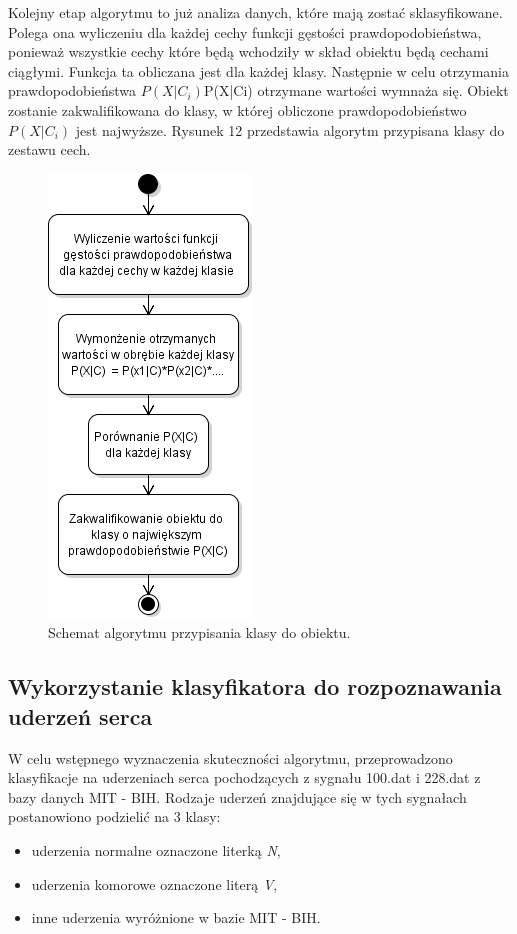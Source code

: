 \documentclass[[10pt,a4paper]{article}
\begin{document}
Kolejny etap algorytmu to już analiza danych, które mają zostać sklasyfikowane. Polega ona wyliczeniu dla każdej cechy funkcji gęstości prawdopodobieństwa, ponieważ wszystkie cechy które będą wchodziły w skład obiektu będą cechami ciągłymi. Funkcja ta obliczana jest dla każdej klasy. Następnie w celu otrzymania prawdopodobieństwa $P(X|C_{i})$P(X|Ci) otrzymane wartości wymnaża się. Obiekt zostanie zakwalifikowana do klasy, w której obliczone prawdopodobieństwo $P(X|C_{i})$ jest najwyższe.  Rysunek 12 przedstawia algorytm przypisana klasy do zestawu cech.
\begin{figure}[h]
\centering
\includegraphics[scale = 0.6]{testowanie_schemat}
\caption{Schemat algorytmu przypisania klasy do obiektu.}
\label{fig:obrazek k}
\end{figure}

\subsection{Wykorzystanie klasyfikatora do rozpoznawania uderzeń serca}

W celu wstępnego wyznaczenia skuteczności algorytmu, przeprowadzono klasyfikacje na uderzeniach serca pochodzących z sygnału 100.dat i 228.dat z bazy danych MIT - BIH. Rodzaje uderzeń znajdujące się w tych sygnałach postanowiono podzielić na 3 klasy: 
\begin{itemize}
\item uderzenia normalne oznaczone literką \textit{N},
\item uderzenia komorowe oznaczone literą \textit{V},
\item inne uderzenia wyróżnione w bazie MIT - BIH.
\end{itemize}
\end{document}
